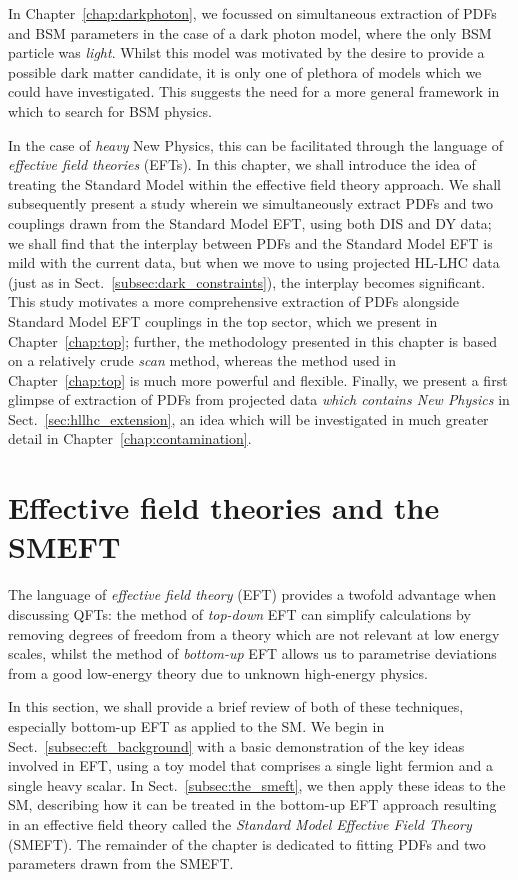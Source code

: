 \documentclass[withindex,glossary]{cam-thesis}
\begin{document}
\noindent In Chapter~\ref{chap:darkphoton}, we focussed on simultaneous extraction of PDFs and BSM parameters in the case of a dark photon model, where the only BSM particle was \textit{light}. Whilst this model was motivated by the desire to provide a possible dark matter candidate, it is only one of plethora of models which we could have investigated. This suggests the need for a more general framework in which to search for BSM physics.

In the case of \textit{heavy} New Physics, this can be facilitated through the language of \textit{effective field theories} (EFTs). In this chapter, we shall introduce the idea of treating the Standard Model within the effective field theory approach. We shall subsequently present a study wherein we simultaneously extract PDFs and two couplings drawn from the Standard Model EFT, using both DIS and DY data; we shall find that the interplay between PDFs and the Standard Model EFT is mild with the current data, but when we move to using projected HL-LHC data (just as in Sect.~\ref{subsec:dark_constraints}), the interplay becomes significant. This study motivates a more comprehensive extraction of PDFs alongside Standard Model EFT couplings in the top sector, which we present in Chapter~\ref{chap:top}; further, the methodology presented in this chapter is based on a relatively crude \textit{scan} method, whereas the method used in Chapter~\ref{chap:top} is much more powerful and flexible. Finally, we present a first glimpse of extraction of PDFs from projected data \textit{which contains New Physics} in Sect.~\ref{sec:hllhc_extension}, an idea which will be investigated in much greater detail in Chapter~\ref{chap:contamination}.

\section{Effective field theories and the SMEFT}
\label{sec:eft_intro}
The language of \textit{effective field theory} (EFT) provides a twofold advantage when discussing QFTs: the method of \textit{top-down} EFT can simplify calculations by removing degrees of freedom from a theory which are not relevant at low energy scales, whilst the method of \textit{bottom-up} EFT allows us to parametrise deviations from a good low-energy theory due to unknown high-energy physics. 

In this section, we shall provide a brief review of both of these techniques, especially bottom-up EFT as applied to the SM. We begin in Sect.~\ref{subsec:eft_background} with a basic demonstration of the key ideas involved in EFT, using a toy model that comprises a single light fermion and a single heavy scalar. In Sect.~\ref{subsec:the_smeft}, we then apply these ideas to the SM, describing how it can be treated in the bottom-up EFT approach resulting in an effective field theory called the \textit{Standard Model Effective Field Theory} (SMEFT). The remainder of the chapter is dedicated to fitting PDFs and two parameters drawn from the SMEFT.
\end{document}
